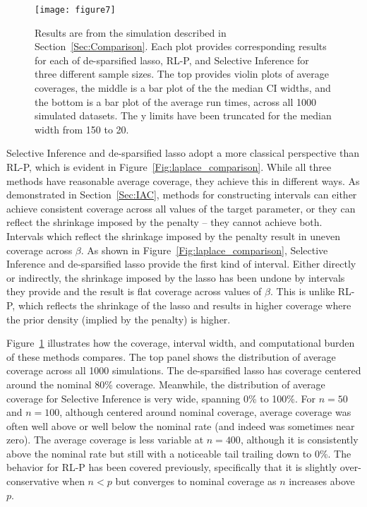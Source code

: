 \begin{figure}[htb!]
  \begin{center}
    \texttt{[image: figure7]}
    \caption{\label{Fig:laplace_other} Results are from the simulation described in Section~\ref{Sec:Comparison}. Each plot provides corresponding results for each of de-sparsified lasso, RL-P, and Selective Inference for three different sample sizes. The top provides violin plots of average coverages, the middle is a bar plot of the the median CI widths, and the bottom is a bar plot of the average run times, across all 1000 simulated datasets. The y limits have been truncated for the median width from 150 to 20.}
  \end{center}
\end{figure}

Selective Inference and de-sparsified lasso adopt a more classical perspective than RL-P, which is evident in Figure~\ref{Fig:laplace_comparison}. While all three methods have reasonable average coverage, they achieve this in different ways. As demonstrated in Section~\ref{Sec:IAC}, methods for constructing intervals can either achieve consistent coverage across all values of the target parameter, or they can reflect the shrinkage imposed by the penalty -- they cannot achieve both. Intervals which reflect the shrinkage imposed by the penalty result in uneven coverage across $\beta$. As shown in Figure~\ref{Fig:laplace_comparison}, Selective Inference and de-sparsified lasso provide the first kind of interval. Either directly or indirectly, the shrinkage imposed by the lasso has been undone by intervals they provide and the result is flat coverage across values of $\beta$. This is unlike RL-P, which reflects the shrinkage of the lasso and results in higher coverage where the prior density (implied by the penalty) is higher.

Figure~\ref{Fig:laplace_other} illustrates how the coverage, interval width, and computational burden of these methods compares. The top panel shows the distribution of average coverage across all 1000 simulations. The de-sparsified lasso has coverage centered around the nominal 80\% coverage. Meanwhile, the distribution of average coverage for Selective Inference is very wide, spanning 0\% to 100\%. For $n = 50$ and $n = 100$, although centered around nominal coverage, average coverage was often well above or well below the nominal rate (and indeed was sometimes near zero). The average coverage is less variable at $n = 400$, although it is consistently above the nominal rate but still with a noticeable tail trailing down to 0\%. The behavior for RL-P has been covered previously, specifically that it is slightly over-conservative when $n < p$ but converges to nominal coverage as $n$ increases above $p$.

